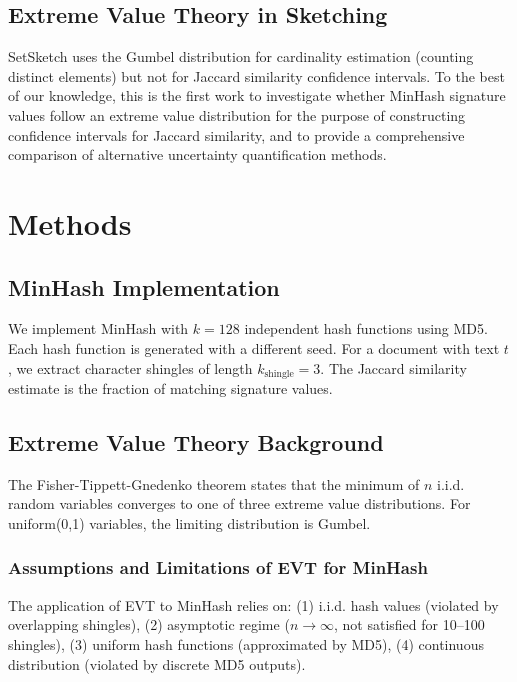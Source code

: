\documentclass[11pt,letterpaper]{article}
\begin{document}
\subsection{Extreme Value Theory in Sketching}

SetSketch \cite{Ertl2021} uses the Gumbel distribution for cardinality estimation (counting distinct elements) but not for Jaccard similarity confidence intervals. To the best of our knowledge, this is the first work to investigate whether MinHash signature values follow an extreme value distribution for the purpose of constructing confidence intervals for Jaccard similarity, and to provide a comprehensive comparison of alternative uncertainty quantification methods.

\section{Methods}

\subsection{MinHash Implementation}

We implement MinHash with $k = 128$ independent hash functions using MD5. Each hash function is generated with a different seed. For a document with text $t$, we extract character shingles of length $k_{\text{shingle}} = 3$. The Jaccard similarity estimate is the fraction of matching signature values.

\subsection{Extreme Value Theory Background}

The Fisher-Tippett-Gnedenko theorem states that the minimum of $n$ i.i.d. random variables converges to one of three extreme value distributions. For uniform(0,1) variables, the limiting distribution is Gumbel.

\subsubsection{Assumptions and Limitations of EVT for MinHash}

The application of EVT to MinHash relies on: (1) i.i.d. hash values (violated by overlapping shingles), (2) asymptotic regime ($n \to \infty$, not satisfied for 10--100 shingles), (3) uniform hash functions (approximated by MD5), (4) continuous distribution (violated by discrete MD5 outputs).
\end{document}
